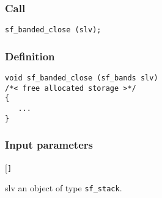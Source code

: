 \subsubsection*{Call}
\begin{verbatim}sf_banded_close (slv);\end{verbatim}

\subsubsection*{Definition}
\begin{verbatim}
void sf_banded_close (sf_bands slv)
/*< free allocated storage >*/
{
   ...
}
\end{verbatim}

\subsubsection*{Input parameters}
\begin{desclist}{\tt }{\quad}[\tt ]
   \setlength\itemsep{0pt}
   \item[slv] an object of type \texttt{sf\_stack}.
\end{desclist}





